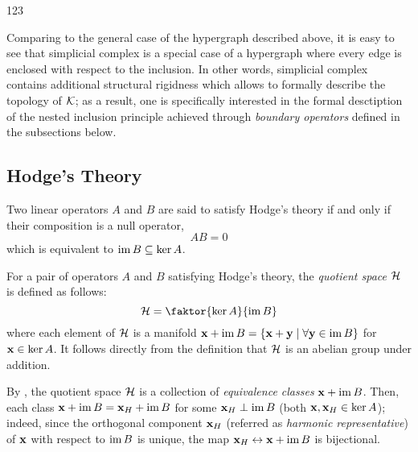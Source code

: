 \begin{example}

      123
      
\end{example}


Comparing to the general case of the hypergraph described above, it is easy to see that simplicial complex is a special case of a hypergraph where every edge is enclosed with respect to the inclusion. In other words, simplicial complex contains additional structural rigidness which allows to formally describe the topology of \( \mathcal{K} \); as a result, one is specifically interested in the formal desctiption of the nested inclusion principle achieved through \emph{boundary operators} defined in the subsections below.


\subsection{ Hodge's Theory }

Two linear operators \( A \) and \( B \) are said to satisfy Hodge's theory if and only if their composition is a null operator, 
\begin{equation}
      A B = 0
\end{equation}
which is equivalent to \( \operatorname{im} B \subseteq \ker A \).

\begin{definition}\label{def:quotient}
      For a pair of operators \( A \) and \( B \) satisfying Hodge's theory, the \emph{quotient space} \( \mathcal{H} \) is defined as follows:
      \begin{equation}
            \mc H = \faktor{ \ker A }{\im B}
      \end{equation}
      where each element of \( \mathcal{H} \) is a manifold \( \mathbf{x} + \operatorname{im} B = \left\{ \mathbf{x} + \mathbf{y} \mid \forall \mathbf{y} \in \operatorname{im} B \right\}\) for \( \mathbf{x} \in \ker A \). It follows directly from the definition that \( \mathcal{H}\) is an abelian group under addition.
\end{definition}

By , the quotient space \( \mathcal{H} \) is a collection of \emph{equivalence classes} \( \mathbf{x} + \operatorname{im} B \). Then, each class \( \mathbf{x} + \operatorname{im} B = \mathbf{x}_H + \operatorname{im} B \) for some \( \mathbf{x}_H \perp \operatorname{im} B \) (both \( \mathbf{x}, \mathbf{x}_H \in \ker A \)); indeed, since the orthogonal component \( \mathbf{x}_H \) (referred as \emph{harmonic representative}) of \( \mathbf{x} \) with respect to \( \operatorname{im} B\) is unique, the map \( \mathbf{x}_H \leftrightarrow \mathbf{x} + \operatorname{im} B \) is bijectional.

